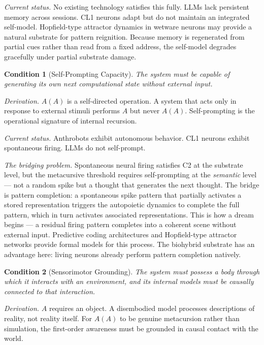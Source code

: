 \documentclass[12pt, letterpaper]{article}
\newtheorem{condition}{Condition}[section]
\begin{document}
\noindent\textit{Current status.} No existing technology satisfies this fully. LLMs lack persistent memory across sessions. CL1 neurons adapt but do not maintain an integrated self-model. Hopfield-type attractor dynamics in wetware neurons may provide a natural substrate for pattern reignition. Because memory is regenerated from partial cues rather than read from a fixed address, the self-model degrades gracefully under partial substrate damage.

\begin{condition}[Self-Prompting Capacity]
\label{cond:selfprompt}
The system must be capable of generating its own next computational state without external input.
\end{condition}

\noindent\textit{Derivation.} $A(A)$ is a self-directed operation. A system that acts only in response to external stimuli performs $A$ but never $A(A)$. Self-prompting is the operational signature of internal recursion.

\noindent\textit{Current status.} Anthrobots exhibit autonomous behavior. CL1 neurons exhibit spontaneous firing. LLMs do not self-prompt.

\noindent\textit{The bridging problem.} Spontaneous neural firing satisfies C2 at the substrate level, but the metacursive threshold requires self-prompting at the \textit{semantic} level --- not a random spike but a thought that generates the next thought. The bridge is pattern completion: a spontaneous spike pattern that partially activates a stored representation triggers the autopoietic dynamics to complete the full pattern, which in turn activates associated representations. This is how a dream begins --- a residual firing pattern completes into a coherent scene without external input. Predictive coding architectures and Hopfield-type attractor networks provide formal models for this process. The biohybrid substrate has an advantage here: living neurons already perform pattern completion natively.

\begin{condition}[Sensorimotor Grounding]
\label{cond:grounding}
The system must possess a body through which it interacts with an environment, and its internal models must be causally connected to that interaction.
\end{condition}

\noindent\textit{Derivation.} $A$ requires an object. A disembodied model processes descriptions of reality, not reality itself. For $A(A)$ to be genuine metacursion rather than simulation, the first-order awareness must be grounded in causal contact with the world.
\end{document}
